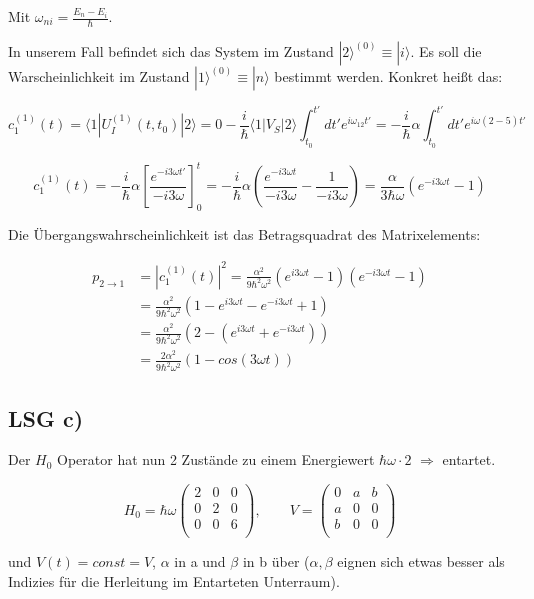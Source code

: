 Mit \(\omega_{ni} =\frac{E_n-E_i}{\hbar} \). 

In unserem Fall befindet sich das System im Zustand \(|2\rangle^{(0)} \equiv |i\rangle  \). Es soll die Warscheinlichkeit im Zustand \(|1\rangle^{(0)} \equiv |n\rangle  \) bestimmt werden. Konkret heißt das:

\[ c_1^{(1)}(t) =  \langle 1| U_I^{(1)}(t,t_0)|2\rangle = 0 - \frac{i}{\hbar}\langle 1|V_S  |2\rangle \int_{t_0}^{t'} dt' e^{i\omega_{12}t'} = - \frac{i}{\hbar}\alpha  \int_{t_0}^{t'} dt' e^{i\omega(2-5)t'}\]

\[ c_1^{(1)}(t) =  - \frac{i}{\hbar}\alpha   \left[\frac{e^{-i3\omega t'}}{-i3\omega}\right]^{t}_{0} = - \frac{i}{\hbar}\alpha (\frac{e^{-i3\omega t}}{-i3\omega}-\frac{1}{-i3\omega}) = \frac{\alpha}{3\hbar\omega} (e^{-i3\omega t}-1) \]

Die Übergangswahrscheinlichkeit ist das Betragsquadrat des Matrixelements:

\begin{align} 
p_{2 \to 1} &= |c_1^{(1)}(t)|^2 = \frac{\alpha^2}{9\hbar^2\omega^2} (e^{i3\omega t}-1)(e^{-i3\omega t}-1) \\
&= \frac{\alpha^2}{9\hbar^2\omega^2} (1-e^{i3\omega t}-e^{-i3\omega t}+1) \\
&= \frac{\alpha^2}{9\hbar^2\omega^2} (2-(e^{i3\omega t}+e^{-i3\omega t})) \\
&= \frac{2\alpha^2}{9\hbar^2\omega^2} (1-cos(3\omega t))
\end{align}

 
\subsection*{LSG c)}

Der \(H_0\) Operator hat nun 2 Zustände zu einem Energiewert \(\hbar\omega\cdot 2\) \(\Rightarrow \) entartet.

\[H_0 = \hbar\omega \begin{pmatrix}2&0&0\\ 0&2&0\\ 0&0&6\\ \end{pmatrix}, \qquad V = \begin{pmatrix}0&a&b\\ a&0&0\\ b&0&0\\ \end{pmatrix} \]

und \(V(t) = const = V\), \(\alpha\) in a und \(\beta\) in b über (\(\alpha,\beta\) eignen sich etwas besser als Indizies für die Herleitung im Entarteten Unterraum).

